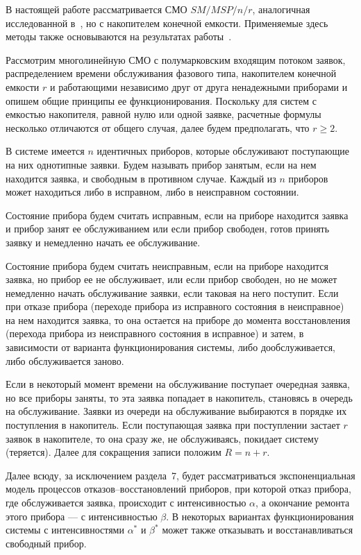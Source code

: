 \begin{multicols}{2}
В настоящей работе рассматривается СМО $SM/MSP/n/r$, аналогичная
исследованной в~\cite{PSCh06}, но с накопителем
конечной емкости. Применяемые здесь методы также основываются на результатах
работы~\cite{PCh03}.



Рассмотрим многолинейную СМО с полумарковским входящим потоком заявок, распределением времени
обслуживания фазового типа, накопителем конечной емкости $r$ и
работающими независимо друг от друга ненадежными приборами и
опишем общие принципы ее функционирования.
Поскольку для систем с емкостью накопителя, равной нулю или одной
заявке, расчетные формулы несколько отличаются от общего случая,
далее будем предполагать, что $r\geq 2$.

В системе имеется $n$ идентичных приборов, которые обслуживают
поступающие на них однотипные заявки.
Будем называть прибор занятым, если на нем находится заявка, и
свободным в противном случае.
Каждый из $n$ приборов может находиться либо в исправном, либо в
неисправном состоянии.

Состояние прибора будем считать исправным, если на приборе находится заявка и 
прибор занят ее обслуживанием или если прибор свободен, готов принять заявку и 
немедленно начать ее обслуживание. 

Состояние прибора будем считать неисправным, если на приборе находится заявка, 
но прибор ее не обслуживает, или если прибор свободен, но не может немедленно 
начать обслуживание заявки, если таковая на него поступит. Если при отказе 
прибора (переходе прибора из исправного состояния в неисправное) на нем 
находится заявка, то она остается на приборе до момента восстановления 
(перехода прибора из неисправного состояния в исправное) и затем, в зависимости 
от варианта функционирования системы, либо дообслуживается, либо обслуживается 
заново.

Если в некоторый момент времени на обслуживание поступает очередная заявка, но 
все приборы заняты, то эта заявка попадает в накопитель, становясь в очередь на 
обслуживание. Заявки из очереди на обслуживание выбираются в порядке их 
поступления в накопитель. Если поступающая заявка при поступлении застает $r$ 
заявок в накопителе, то она сразу же, не обслуживаясь, покидает систему 
(теряется). Далее для сокращения записи положим $R=n+r$.

Далее всюду, за исключением раздела~7, будет рассматриваться экспоненциальная
модель процессов отказов--восстановлений приборов, при которой отказ
прибора, где обслуживается заявка, происходит с интенсивностью
$\alpha$, а окончание ремонта этого прибора --- с интенсивностью $\beta$.
В некоторых вариантах функционирования системы с интенсивностями $\alpha^*$
и $\beta^*$ может также отказывать и восстанавливаться свободный прибор.


\end{multicols}
